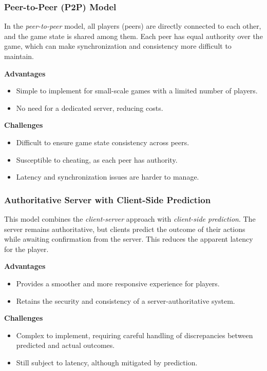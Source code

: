 \documentclass{article} %
\begin{document}
\subsubsection{Peer-to-Peer (P2P) Model}
In the \textit{peer-to-peer} model, all players (peers) are directly connected to each other, and the game state is shared among them. Each peer has equal authority over the game, which can make synchronization and consistency more difficult to maintain.

\textbf{Advantages}
\begin{itemize}
	\item Simple to implement for small-scale games with a limited number of players.
	\item No need for a dedicated server, reducing costs.
\end{itemize}

\textbf{Challenges}
\begin{itemize}
	\item Difficult to ensure game state consistency across peers.
	\item Susceptible to cheating, as each peer has authority.
	\item Latency and synchronization issues are harder to manage.
\end{itemize}

\subsubsection{Authoritative Server with Client-Side Prediction}
This model combines the \textit{client-server} approach with \textit{client-side prediction}. The server remains authoritative, but clients predict the outcome of their actions while awaiting confirmation from the server. This reduces the apparent latency for the player.

\textbf{Advantages}
\begin{itemize}
	\item Provides a smoother and more responsive experience for players.
	\item Retains the security and consistency of a server-authoritative system.
\end{itemize}

\textbf{Challenges}
\begin{itemize}
	\item Complex to implement, requiring careful handling of discrepancies between predicted and actual outcomes.
	\item Still subject to latency, although mitigated by prediction.
\end{itemize}
\end{document}
